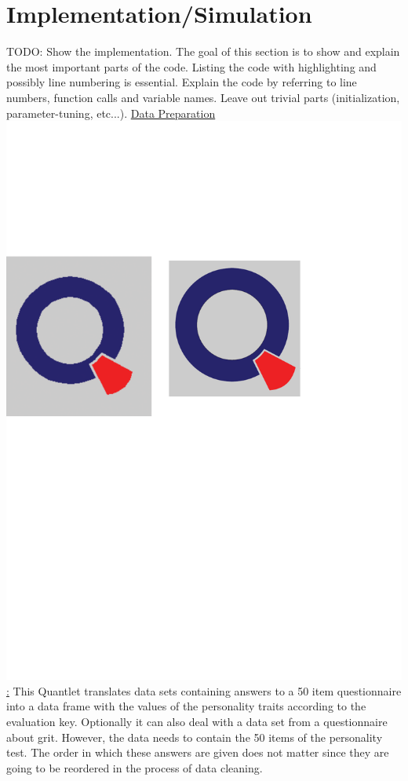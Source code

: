 \section{Implementation/Simulation}
TODO: Show the implementation. The goal of this section is to show and explain the most important
parts of the code. Listing the code with highlighting and possibly line numbering is essential.
Explain the code by referring to line numbers, function calls and variable names.
Leave out trivial parts (initialization, parameter-tuning, etc...).
\newline
\underline{Data Preparation \href{https://github.com/Matthias2193/SPL/tree/master/Big5GritDataPreparation}{\includegraphics[scale = 0.06]{Figures/qletlogo.pdf}} :} 
\newline 
This Quantlet translates data sets containing answers to a 50 item questionnaire into a data frame with the values of the personality traits according to the evaluation key. Optionally it can also deal with a data set from a questionnaire about grit. However, the data needs to contain the 50 items of the personality test. The order in which these answers are given does not matter since they are going to be reordered in the process of data cleaning.

